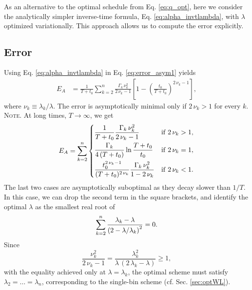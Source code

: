 \documentclass[reprint, floatfix]{revtex4-1}
\newcommand{\note}[1]{{\color{DarkGreen}\footnotesize \textsc{Note.} #1}}
\newcommand{\Err}{E}
\begin{document}
As an alternative to the
optimal schedule from Eq. \eqref{eq:q_opt},
%
here we consider the analytically simpler
inverse-time formula, Eq. \eqref{eq:alpha_invtlambda},
with $\lambda$ optimized variationally.
%
This approach allows us to compute the error explicitly.



\subsection{\label{sec:invt_error}
Error
}



Using Eq. \eqref{eq:alpha_invtlambda}
in Eq. \eqref{eq:error_asym1} yields
%
\begin{align}
\Err_A
&=
\frac{    1    }
     { T + t_0 }
\sum_{k = 2}^n
  \frac{ \Gamma_k \, \nu_k^2 }
       {    2 \, \nu_k - 1   }
\left[
  1 - \left(
        \frac {     t_0 }
              { T + t_0 }
      \right)^{ 2 \, \nu_k - 1 }
\right],
\label{eq:error_asym_invt}
\end{align}
%
where $\nu_k \equiv \lambda_k / \lambda$.
%
The error is asymptotically minimal
only if $2\,\nu_k > 1$ for every $k$.
%
\note{At long times, $T \to \infty$, we get
$$
\begin{aligned}
  \Err_A
  =
  \sum_{k = 2}^n
  \begin{dcases}
    \frac{    1    }
         { T + t_0 }
    \frac{ \Gamma_k \, \nu_k^2 }
         {   2 \, \nu_k - 1    }
    &
    \mathrm{if \;} 2 \, \nu_k > 1,
    \\%
    \frac{    \Gamma_k    }
         { 4 \, (T + t_0) }
    \ln \frac{ T + t_0 }
             {   t_0   }
    &
    \mathrm{if \;} 2 \, \nu_k = 1,
    \\
    \frac{  t_0^{ 2 \, \nu_k  - 1}  }
         { (T + t_0)^{ 2 \, \nu_k } }
    \frac{ \Gamma_k \, \nu_k^2 }
         {   1 - 2 \, \nu_k    }
    &
    \mathrm{if \;} 2 \, \nu_k < 1.
  \end{dcases}
\end{aligned}
$$
%
The last two cases
are asymptotically suboptimal
as they decay slower than $1/T$.
}%
%
In this case,
we can drop the second term
in the square brackets,
and identify the optimal $\lambda$ as
the smallest real root of
%
\begin{equation}
  \sum_{k = 2}^n
    \frac { \lambda_k - \lambda }
          { \left(2 - \lambda/ \lambda_k \right)^2 }
  = 0.
\notag
\end{equation}
%
Since
$$
\frac{ \nu_k^2        }
     { 2 \, \nu_k - 1 }
=
\frac{ \lambda_k^2 }
     { \lambda \, (2 \, \lambda_k - \lambda) }
\ge 1
,
$$
with the equality achieved only at $\lambda = \lambda_k$,
the optimal scheme must satisfy
$\lambda_2 = \dots = \lambda_n$,
corresponding to the single-bin scheme
(cf. Sec. \ref{sec:optWL}).
\end{document}
